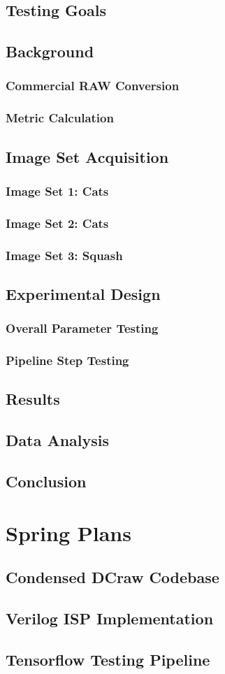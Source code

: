 \documentclass{report}
\begin{document}
	\section{Testing Goals}
	\section{Background}
		\subsection{Commercial RAW Conversion}
		\subsection{Metric Calculation}
	\section{Image Set Acquisition}
		\subsection{Image Set 1: Cats}
		\subsection{Image Set 2: Cats}
		\subsection{Image Set 3: Squash}
	\section{Experimental Design}
		\subsection{Overall Parameter Testing}
		\subsection{Pipeline Step Testing}
	\section{Results}
	\section{Data Analysis}
	\section{Conclusion}

\chapter{Spring Plans}

\appendix

\section{Condensed DCraw Codebase}

\section{Verilog ISP Implementation}

\section{Tensorflow Testing Pipeline}
\end{document}
